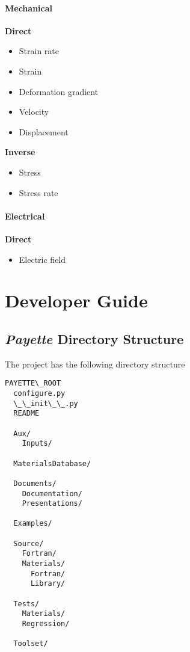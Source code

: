 \documentclass[letterpaper,10pt,english]{sphinxmanual}
\begin{document}
\subsubsection{Mechanical}
\label{Files/introduction:mechanical}
\textbf{Direct}
\begin{itemize}
\item {} 
Strain rate

\item {} 
Strain

\item {} 
Deformation gradient

\item {} 
Velocity

\item {} 
Displacement

\end{itemize}

\textbf{Inverse}
\begin{itemize}
\item {} 
Stress

\item {} 
Stress rate

\end{itemize}


\subsubsection{Electrical}
\label{Files/introduction:electrical}
\textbf{Direct}
\begin{itemize}
\item {} 
Electric field

\end{itemize}


\chapter{Developer Guide}
\label{Files/layout::doc}\label{Files/layout:developer-guide}

\section{\emph{Payette} Directory Structure}
\label{Files/layout:payette-directory-structure}
The  project has the following directory structure

\begin{Verbatim}[commandchars=\\\{\}]
PAYETTE\_ROOT
  configure.py
  \_\_init\_\_.py
  README

  Aux/
    Inputs/

  MaterialsDatabase/

  Documents/
    Documentation/
    Presentations/

  Examples/

  Source/
    Fortran/
    Materials/
      Fortran/
      Library/

  Tests/
    Materials/
    Regression/

  Toolset/
\end{Verbatim}
\end{document}
